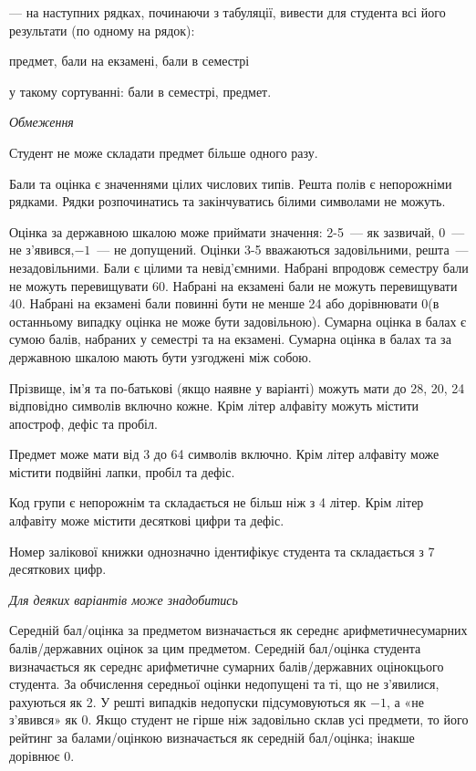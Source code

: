 \documentclass[11pt, ukrainian]{article}
\begin{document}
{\noindent}--- на наступних рядках, починаючи з табуляції, вивести для студента всі його результати (по одному на рядок):\par
предмет, бали на екзамені, бали в семестрі

{\noindent}у такому сортуванні: бали в семестрі, предмет.


\bigskip\textit{Обмеження}

Студент не може складати предмет більше одного разу.

Бали та оцінка є значеннями цілих числових типів. Решта полів є непорожніми рядками.
Рядки розпочинатись та закінчуватись білими символами не можуть.

Оцінка за державною шкалою може приймати значення: 2-5~--- як зазвичай, 0~--- не з’явився,$-1$~--- не допущений. 
Оцінки 3-5 вважаються задовільними, решта~--- незадовільними. 
Бали є цілими та невід’ємними.
Набрані впродовж семестру бали не можуть перевищувати 60. 
Набрані на екзамені бали не можуть перевищувати 40. 
Набрані на екзамені бали повинні бути не менше 24 або дорівнювати 0(в останньому випадку оцінка не може бути задовільною). 
Сумарна оцінка в балах є сумою балів, набраних у семестрі та на екзамені.
Сумарна оцінка в балах та за державною шкалою мають бути узгоджені між собою.

Прізвище, ім’я та по-батькові (якщо наявне у варіанті) можуть мати до 28, 20, 24 відповідно символів включно кожне. 
Крім літер алфавіту можуть містити апостроф, дефіс та пробіл.

Предмет може мати від 3 до 64 символів включно. 
Крім літер алфавіту може містити подвійні лапки, пробіл та дефіс.

Код групи є непорожнім та складається не більш ніж з 4 літер. 
Крім літер алфавіту може містити десяткові цифри та дефіс.


Номер залікової книжки однозначно ідентифікує студента та складається з 7 десяткових цифр. 

\bigskip\textit{Для деяких варіантів може знадобитись}

Середній бал/оцінка за предметом визначається як середнє арифметичнесумарних балів/державних оцінок за цим предметом. 
Середній бал/оцінка студента визначається як середнє арифметичне сумарних балів/державних оцінокцього студента. 
За обчислення середньої оцінки недопущені та ті, що не з’явилися, рахуються як 2.
У решті випадків недопуски підсумовуються як $-1$, а «не з’явився» як 0.
Якщо студент не гірше ніж задовільно склав усі предмети, 
то його рейтинг за балами/оцінкою визначається як середній бал/оцінка; інакше дорівнює 0.
\end{document}
